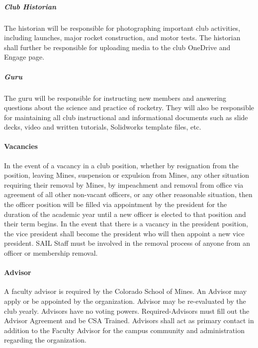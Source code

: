 \documentclass[12pt]{article}
\begin{document}
\subparagraph{Club Historian} The historian will be responsible for photographing important club activities, 
including launches, major rocket construction, and motor tests. 
The historian shall further be responsible for uploading media to the club OneDrive and Engage page.

\subparagraph{Guru} The guru will be responsible for instructing new members and answering questions about the science and practice of rocketry. 
They will also be responsible for maintaining all club instructional and informational documents such as slide decks, 
video and written tutorials, Solidworks template files, etc.

\paragraph{Vacancies}
In the event of a vacancy in a club position, 
whether by resignation from the position, 
leaving Mines, suspension or expulsion from Mines, 
any other situation requiring their removal by Mines, 
by impeachment and removal from office via agreement of all other non-vacant officers, 
or any other reasonable situation, 
then the officer position will be filled via appointment by the president for the duration of the academic year until a new officer is elected to that position and their term begins. 
In the event that there is a vacancy in the president position, 
the vice president shall become the president who will then appoint a new vice president. 
SAIL Staff must be involved in the removal process of anyone from an officer or membership removal.

\paragraph{Advisor}
A faculty advisor is required by the Colorado School of Mines. 
An Advisor may apply or be appointed by the organization. 
Advisor may be re-evaluated by the club yearly. 
Advisors have no voting powers. 
Required-Advisors must fill out the Advisor Agreement and be CSA Trained. 
Advisors shall act as primary contact in addition to the Faculty Advisor for the campus community and administration regarding the organization. 
\end{document}
